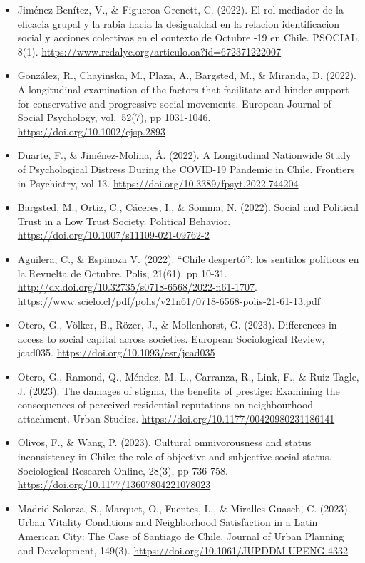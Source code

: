 \documentclass[
  12pt,
]{article}
\begin{document}
\begin{itemize}
\item
  Jiménez-Benítez, V., \& Figueroa-Grenett, C. (2022). El rol mediador de la eficacia grupal y la rabia hacia la desigualdad en la relacion identificacion social y acciones colectivas en el contexto de Octubre -19 en Chile. PSOCIAL, 8(1). \url{https://www.redalyc.org/articulo.oa?id=672371222007}
\item
  González, R., Chayinska, M., Plaza, A., Bargsted, M., \& Miranda, D. (2022). A longitudinal examination of the factors that facilitate and hinder support for conservative and progressive social movements. European Journal of Social Psychology, vol.~52(7), pp 1031-1046. \url{https://doi.org/10.1002/ejsp.2893}
\item
  Duarte, F., \& Jiménez-Molina, Á. (2022). A Longitudinal Nationwide Study of Psychological Distress During the COVID-19 Pandemic in Chile. Frontiers in Psychiatry, vol 13. \url{https://doi.org/10.3389/fpsyt.2022.744204}
\item
  Bargsted, M., Ortiz, C., Cáceres, I., \& Somma, N. (2022). Social and Political Trust in a Low Trust Society. Political Behavior. \url{https://doi.org/10.1007/s11109-021-09762-2}
\item
  Aguilera, C., \& Espinoza V. (2022). ``Chile despertó'': los sentidos políticos en la Revuelta de Octubre. Polis, 21(61), pp 10-31. \url{http://dx.doi.org/10.32735/s0718-6568/2022-n61-1707}. \url{https://www.scielo.cl/pdf/polis/v21n61/0718-6568-polis-21-61-13.pdf}
\item
  Otero, G., Völker, B., Rözer, J., \& Mollenhorst, G. (2023). Differences in access to social capital across societies. European Sociological Review, jcad035. \url{https://doi.org/10.1093/esr/jcad035}
\item
  Otero, G., Ramond, Q., Méndez, M. L., Carranza, R., Link, F., \& Ruiz-Tagle, J. (2023). The damages of stigma, the benefits of prestige: Examining the consequences of perceived residential reputations on neighbourhood attachment. Urban Studies. \url{https://doi.org/10.1177/00420980231186141}
\item
  Olivos, F., \& Wang, P. (2023). Cultural omnivorousness and status inconsistency in Chile: the role of objective and subjective social status. Sociological Research Online, 28(3), pp 736-758. \url{https://doi.org/10.1177/13607804221078023}
\item
  Madrid-Solorza, S., Marquet, O., Fuentes, L., \& Miralles-Guasch, C. (2023). Urban Vitality Conditions and Neighborhood Satisfaction in a Latin American City: The Case of Santiago de Chile. Journal of Urban Planning and Development, 149(3). \url{https://doi.org/10.1061/JUPDDM.UPENG-4332}

\end{itemize}
\end{document}
